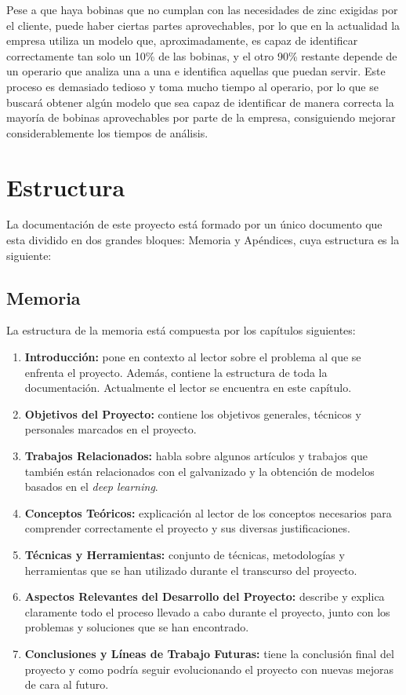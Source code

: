 Pese a que haya bobinas que no cumplan con las necesidades de zinc exigidas por el cliente, puede haber ciertas partes aprovechables, por lo que en la actualidad la empresa utiliza un modelo que, aproximadamente, es capaz de identificar correctamente tan solo un 10\% de las bobinas, y el otro 90\% restante depende de un operario que analiza una a una e identifica aquellas que puedan servir. Este proceso es demasiado tedioso y toma mucho tiempo al operario, por lo que se buscará obtener algún modelo que sea capaz de identificar de manera correcta la mayoría de bobinas aprovechables por parte de la empresa, consiguiendo mejorar considerablemente los tiempos de análisis. 

\section{Estructura}
La documentación de este proyecto está formado por un único documento que esta dividido en dos grandes bloques: Memoria y Apéndices, cuya estructura es la siguiente:

\subsection{Memoria}
La estructura de la memoria está compuesta por los capítulos siguientes:
\begin{enumerate}
    \item \textbf{Introducción:} pone en contexto al lector sobre el problema al que se enfrenta el proyecto. Además, contiene la estructura de toda la documentación. Actualmente el lector se encuentra en este capítulo.
    \item \textbf{Objetivos del Proyecto:} contiene los objetivos generales, técnicos y personales marcados en el proyecto.
    \item \textbf{Trabajos Relacionados:} habla sobre algunos artículos y trabajos que también están relacionados con el galvanizado y la obtención de modelos basados en el \emph{deep learning}.
    \item \textbf{Conceptos Teóricos:} explicación al lector de los conceptos necesarios para comprender correctamente el proyecto y sus diversas justificaciones.
    \item \textbf{Técnicas y Herramientas:} conjunto de técnicas, metodologías y herramientas que se han utilizado durante el transcurso del proyecto.
    \item \textbf{Aspectos Relevantes del Desarrollo del Proyecto:} describe y explica claramente todo el proceso llevado a cabo durante el proyecto, junto con los problemas y soluciones que se han encontrado.
    \item \textbf{Conclusiones y Líneas de Trabajo Futuras:} tiene la conclusión final del proyecto y como podría seguir evolucionando el proyecto con nuevas mejoras de cara al futuro.
\end{enumerate}

